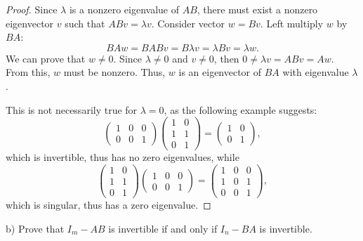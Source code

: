\documentclass{article}
\theoremstyle{definition}
\begin{document}
\begin{proof}

Since $\lambda$ is a nonzero eigenvalue of $AB$, there must exist a nonzero eigenvector $v$ such that $ABv = \lambda v$.
Consider vector $w = Bv$.
Left multiply $w$ by $BA$:
\[ BAw = BABv = B\lambda v = \lambda Bv = \lambda w. \]
We can prove that $w \neq 0$.
Since $\lambda \neq 0$ and $v \neq 0$, then $0 \neq \lambda v = ABv = Aw$.
From this, $w$ must be nonzero.
Thus, $w$ is an eigenvector of $BA$ with eigenvalue $\lambda$.

This is not necessarily true for $\lambda = 0$, as the following example suggests:
\[
    \begin{pmatrix}
        1 & 0 & 0 \\
        0 & 0 & 1
    \end{pmatrix}
    \begin{pmatrix}
        1 & 0 \\
        1 & 1 \\
        0 & 1
    \end{pmatrix}
    =
    \begin{pmatrix}
        1 & 0 \\
        0 & 1
    \end{pmatrix},
\]
which is invertible, thus has no zero eigenvalues, while
\[
    \begin{pmatrix}
        1 & 0 \\
        1 & 1 \\
        0 & 1
    \end{pmatrix}
    \begin{pmatrix}
        1 & 0 & 0 \\
        0 & 0 & 1
    \end{pmatrix}
    =
    \begin{pmatrix}
        1 & 0 & 0 \\
        1 & 0 & 1 \\
        0 & 0 & 1
    \end{pmatrix},
\]
which is singular, thus has a zero eigenvalue.

\end{proof}

\begin{tcolorbox}
b) Prove that $I_m - AB$ is invertible if and only if $I_n - BA$ is invertible.
\end{tcolorbox}
\end{document}
